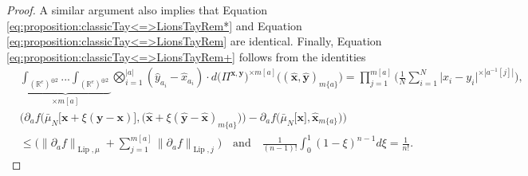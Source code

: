 \documentclass[a4paper,11pt,twoside]{article}
\numberwithin{equation}{section}
\theoremstyle{plain}
\newcommand{\bR}{\mathbb{R}}
\DeclareMathOperator{\lip}{Lip}
\newcommand{\1}{\mathbbm{1}}
\begin{document}
\begin{proof}
		A similar argument also implies that Equation \eqref{eq:proposition:classicTay<=>LionsTayRem*} and Equation \eqref{eq:proposition:classicTay<=>LionsTayRem} are identical. Finally, Equation \eqref{eq:proposition:classicTay<=>LionsTayRem+} follows from the identities
		\begin{align*}
			&\underbrace{\int_{(\bR^e)^{\oplus 2}} ... \int_{(\bR^e)^{\oplus 2}}}_{\times m[a]} \bigotimes_{i=1}^{|a|} ( \hat{y}_{a_i} - \hat{x}_{a_i} ) \cdot d\big( \Pi^{\boldsymbol{x}, \boldsymbol{y}} \big)^{\times m[a]} \Big( (\hat{\boldsymbol{x}}, \hat{\boldsymbol{y}})_{m\{a\}} \Big) = \prod_{j=1}^{m[a]} \bigg( \frac{1}{N} \sum_{i=1}^N \big| x_i - y_i \big|^{\times |a^{-1}[j]|} \bigg), 
			\\
			&\bigg( \partial_a f\Big( \bar{\mu}_N\big[ \boldsymbol{x}+\xi(\boldsymbol{y}-\boldsymbol{x}) \big], \big( \hat{\boldsymbol{x}} + \xi(\hat{\boldsymbol{y}} - \hat{\boldsymbol{x}} )_{m\{a\}} \big) \Big) - \partial_a f\Big( \bar{\mu}_N\big[ \boldsymbol{x} \big], \hat{\boldsymbol{x}}_{m\{a\}} \Big) \bigg)
			\\
			&\leq \Big( \big\| \partial_a f \big\|_{\lip, \mu} + \sum_{j=1}^{m[a]} \big\| \partial_a f \big\|_{\lip, j} \Big) 
			\quad \mbox{and}\quad
			\tfrac{1}{(n-1)!} \int_0^1 (1-\xi)^{n-1} d\xi = \tfrac{1}{n!}. 
		\end{align*}
	\end{proof}
	
\end{document}
